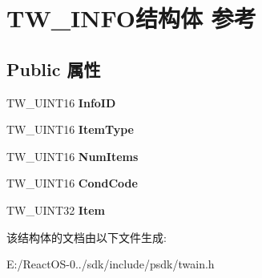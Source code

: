 \hypertarget{struct_t_w___i_n_f_o}{}\section{T\+W\+\_\+\+I\+N\+F\+O结构体 参考}
\label{struct_t_w___i_n_f_o}
\subsection*{Public 属性}
\begin{DoxyCompactItemize}
\item 
\mbox{\label{struct_t_w___i_n_f_o_a22128f32961e7c8674ba8afe0db83b68}} 
T\+W\+\_\+\+U\+I\+N\+T16 {\bfseries Info\+ID}
\item 
\mbox{\label{struct_t_w___i_n_f_o_ac0f16b031b1012c5c4b36a498a88af29}} 
T\+W\+\_\+\+U\+I\+N\+T16 {\bfseries Item\+Type}
\item 
\mbox{\label{struct_t_w___i_n_f_o_a3df7aee712c6bdfdb8d2e4c17b512edf}} 
T\+W\+\_\+\+U\+I\+N\+T16 {\bfseries Num\+Items}
\item 
\mbox{\label{struct_t_w___i_n_f_o_a3f5d245d50ff2cdaf5e9c357f62fe238}} 
T\+W\+\_\+\+U\+I\+N\+T16 {\bfseries Cond\+Code}
\item 
\mbox{\label{struct_t_w___i_n_f_o_aa13b93d603b94a7131b407f0fb2dc47a}} 
T\+W\+\_\+\+U\+I\+N\+T32 {\bfseries Item}
\end{DoxyCompactItemize}


该结构体的文档由以下文件生成\+:\begin{DoxyCompactItemize}
\item 
E\+:/\+React\+O\+S-\/0../sdk/include/psdk/twain.\+h\end{DoxyCompactItemize}
